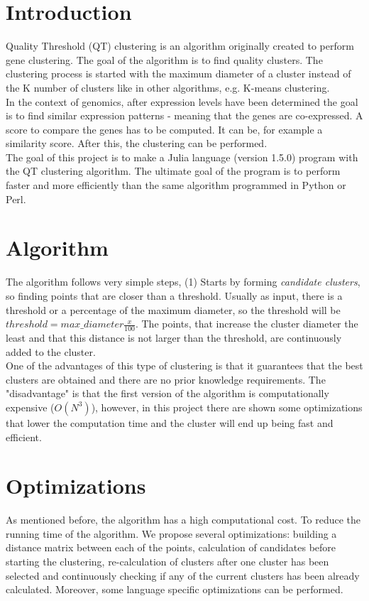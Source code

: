 \noindent\section*{Introduction}
Quality Threshold (QT) clustering is an algorithm originally created to perform gene clustering. The goal of the algorithm is to find quality clusters. The clustering process is started with the maximum diameter of a cluster instead of the K number of clusters like in other algorithms, e.g. K-means clustering. \cite{Heyer, Jin}  \\

\noindent In the context of genomics, after expression levels have been determined the goal is to find similar expression patterns - meaning that the genes are co-expressed. A score to compare the genes has to be computed. It can be, for example a similarity score. After this, the clustering can be performed. \cite{Heyer} \\

\noindent The goal of this project is to make a Julia language (version 1.5.0) program with the QT clustering algorithm. The ultimate goal of the program is to perform faster and more efficiently than the same algorithm programmed in Python or Perl. 

\noindent\section*{Algorithm}
The algorithm follows very simple steps, (1) Starts by forming \textit{candidate clusters}, so finding points that are closer than a threshold. Usually as input, there is a threshold or a percentage of the maximum diameter, so the threshold will be $threshold = max\_diameter \frac{x}{100}$. The points, that increase the cluster diameter the least and that this distance is not larger than the threshold, are continuously added to the cluster. \\ 

\noindent One of the advantages of this type of clustering is that it guarantees that the best clusters are obtained and there are no prior knowledge requirements. The "disadvantage" is that the first version of the algorithm is computationally expensive ($O(N^3)$), however, in this project there are shown some optimizations that lower the computation time and the cluster will end up being fast and efficient.

\section*{Optimizations}
\noindent As mentioned before, the algorithm has a high computational cost. To reduce the running time of the algorithm. We propose several optimizations: building a distance matrix between each of the points, calculation of candidates before starting the clustering, re-calculation of clusters after one cluster has been selected and continuously checking if any of the current clusters has been already calculated. Moreover, some language specific optimizations can be performed. \\

